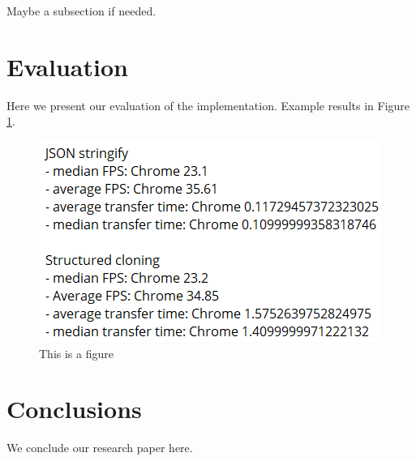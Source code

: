 \documentclass[conference]{IEEEtran}
\begin{document}
Maybe a subsection if needed.

\section{Evaluation}
\label{sec:sec2}

Here we present our evaluation of the implementation.
Example results in Figure \ref{fig:labeloffigure}. 

\begin{figure}[ht]
	\centering
	\includegraphics[scale=0.5]{figs/example.png}
	\caption{This is a figure}
	\label{fig:labeloffigure}
\end{figure}

\section{Conclusions}
\label{sec:conc}

We conclude our research paper here.

\printbibliography[title={References}]
\end{document}
